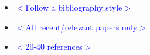 \documentclass[runningheads]{llncs}
\newcommand\cc[1]{}
\newcommand\cci[1]{}
\renewcommand\cc[1][$<$cite?$>$]{\textcolor{blue}{$<$#1$>$}}%
\renewcommand\cci[1][]{
		\par\noindent
		\begin{itemize}
			\nointerlineskip
			\item \cc[#1]%
		\end{itemize}
	}
\begin{document}


\maketitle              %
















\cci[Follow a bibliography style]
\cci[All recent/relevant papers only]
\cci[20-40 references]

% 
% 
\end{document}
